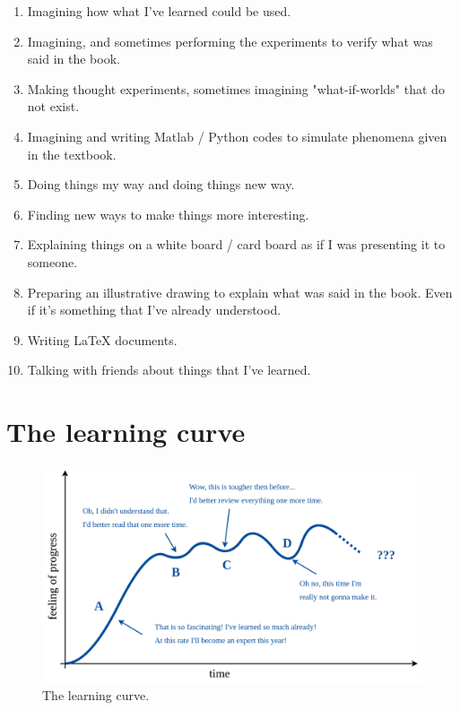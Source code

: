 \documentclass[12pt]{report}
\begin{document}
\begin{enumerate}

\item Imagining how what I've learned could be used.

\item Imagining, and sometimes performing the experiments to verify what was said in the book.

\item Making thought experiments, sometimes imagining "what-if-worlds" that do not exist.

\item Imagining and writing Matlab / Python codes to simulate phenomena given in the textbook.

\item Doing things my way and doing things new way. 

\item Finding new ways to make things more interesting.

\item Explaining things on a white board / card board as if I was presenting it to someone.

\item Preparing an illustrative drawing to explain what was said in the book. Even if it's something that I've already understood.

\item Writing LaTeX documents.

\item Talking with friends about things that I've learned. 

\end{enumerate}



\section{The learning curve} \label{chap:learning_curve}

\begin{figure}[H]
\centering\includegraphics[width=14.5cm]{learning_curve}
\caption{The learning curve.}			
\label{fig:learning_curve}
\end{figure}
\end{document}
